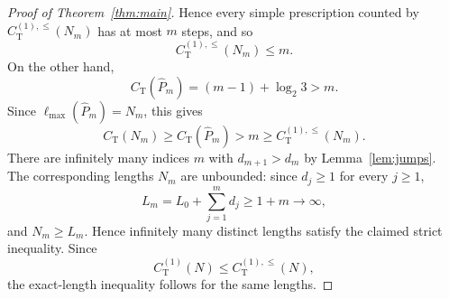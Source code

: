 \documentclass[10pt,a4paper]{amsart}
\newcommand{\CT}{C_{\mathrm T}}
\newcommand{\CTsimp}{C_{\mathrm T}^{(1)}}
\newcommand{\CTsimpenv}{C_{\mathrm T}^{(1),\leq}}
\newcommand{\ellmax}{\ell_{\max}}
\begin{document}
\begin{proof}[Proof of Theorem~\ref{thm:main}]
Hence every simple prescription counted by $\CTsimpenv(N_m)$ has at most $m$ steps, and so
\begin{equation}
\CTsimpenv(N_m)\leq m.
\end{equation}
On the other hand,
\begin{equation}
\CT(\widehat P_m)=(m-1)+\log_2 3>m.
\end{equation}
Since $\ellmax(\widehat P_m)=N_m$, this gives
\begin{equation}
\CT(N_m)\geq \CT(\widehat P_m)>m\geq \CTsimpenv(N_m).
\end{equation}
There are infinitely many indices $m$ with $d_{m+1}>d_m$ by Lemma~\ref{lem:jumps}. The corresponding lengths $N_m$ are unbounded: since $d_j\geq 1$ for every $j\geq 1$,
\begin{equation}
L_m=L_0+\sum_{j=1}^{m}d_j\geq 1+m\longrightarrow\infty,
\end{equation}
and $N_m\geq L_m$. Hence infinitely many distinct lengths satisfy the claimed strict inequality. Since
\begin{equation}
\CTsimp(N)\leq \CTsimpenv(N),
\end{equation}
the exact-length inequality follows for the same lengths.
\end{proof}
\end{document}
